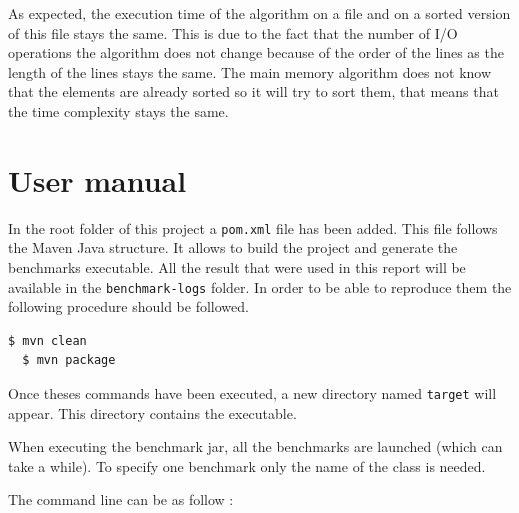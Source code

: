 \documentclass[12pt]{article}
\begin{document}
As expected, the execution time of the algorithm on a file and on a sorted version of this file stays the same. This is due to the fact that the number of I/O operations the algorithm does not change because of the order of the lines as the length of the lines stays the same. The main memory algorithm does not know that the elements are already sorted so it will try to sort them, that means that the time complexity stays the same.

\section{User manual}
In the root folder of this project a \texttt{pom.xml} file has been added. This file follows the Maven Java structure. It allows to build the project and generate the benchmarks executable. All the result that were used in this report will be available in the \texttt{benchmark-logs} folder. In order to be able to reproduce them the following procedure should be followed.

\begin{lstlisting}[language=bash]
  $ mvn clean
  $ mvn package
\end{lstlisting}

Once theses commands have been executed, a new directory named \texttt{target} will appear. This directory contains the executable.

When executing the benchmark jar, all the benchmarks are launched (which can take a while). To specify one benchmark only the name of the class is needed.

The command line can be as follow :
\end{document}
